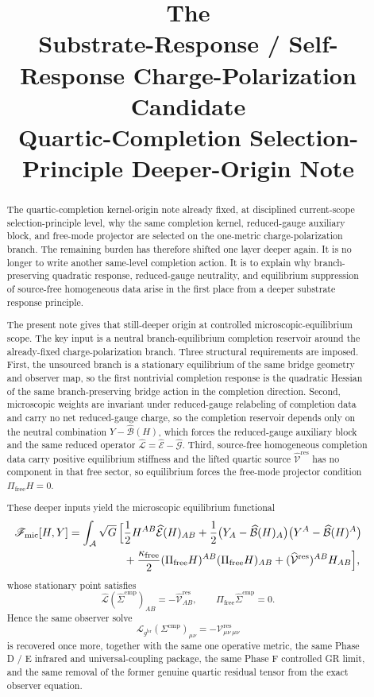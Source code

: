 \documentclass[11pt]{article}
\title{\textbf{The \TheoryName{}}\\[0.4em]
\large Substrate-Response / Self-Response Charge-Polarization Candidate\\
\large Quartic-Completion Selection-Principle Deeper-Origin Note}
\author{}
\date{}
\newcommand{\Sub}{\mathcal A}
\newcommand{\ObserverMetric}{g^{\mathrm{br}}}
\newcommand{\CompShift}{\Sigma^{\mathrm{cmp}}}
\newcommand{\CompLift}{\widehat\Sigma^{\mathrm{cmp}}}
\newcommand{\ResidualCore}{\mathcal V_{\mu\nu}^{\mathrm{res}}}
\newcommand{\ResidualLift}{\widehat{\mathcal V}^{\mathrm{res}}}
\newcommand{\SubEinLin}{\widehat{\mathcal E}}
\newcommand{\SubGaugeVec}{\widehat{\mathcal B}}
\newcommand{\SubGaugeBook}{\widehat{\mathcal G}}
\newcommand{\SubReducedEin}{\widehat{\mathcal L}}
\newcommand{\FreeProj}{\Pi_{\mathrm{free}}}
\newcommand{\GaugeAux}{Y}
\newcommand{\ReducedEin}{\mathcal L_{\ObserverMetric}}
\newcommand{\MicFunctional}{\mathscr F_{\mathrm{mic}}}
\newcommand{\FreeStiff}{\kappa_{\mathrm{free}}}
\begin{document}
\maketitle

\begin{abstract}
The quartic-completion kernel-origin note already fixed, at disciplined current-scope selection-principle level, why the same completion kernel, reduced-gauge auxiliary block, and free-mode projector are selected on the one-metric charge-polarization branch. The remaining burden has therefore shifted one layer deeper again. It is no longer to write another same-level completion action. It is to explain why branch-preserving quadratic response, reduced-gauge neutrality, and equilibrium suppression of source-free homogeneous data arise in the first place from a deeper substrate response principle.

The present note gives that still-deeper origin at controlled microscopic-equilibrium scope. The key input is a neutral branch-equilibrium completion reservoir around the already-fixed charge-polarization branch. Three structural requirements are imposed. First, the unsourced branch is a stationary equilibrium of the same bridge geometry and observer map, so the first nontrivial completion response is the quadratic Hessian of the same branch-preserving bridge action in the completion direction. Second, microscopic weights are invariant under reduced-gauge relabeling of completion data and carry no net reduced-gauge charge, so the completion reservoir depends only on the neutral combination \(\GaugeAux-\SubGaugeVec(H)\), which forces the reduced-gauge auxiliary block and the same reduced operator \(\SubReducedEin=\SubEinLin-\SubGaugeBook\). Third, source-free homogeneous completion data carry positive equilibrium stiffness and the lifted quartic source \(\ResidualLift\) has no component in that free sector, so equilibrium forces the free-mode projector condition \(\FreeProj H=0\).

These deeper inputs yield the microscopic equilibrium functional
\[
\begin{aligned}
\MicFunctional[H,\GaugeAux]
=
\int_{\Sub}\sqrt{G}\,
\Bigl[
&\frac12 H^{AB}\SubEinLin(H)_{AB}
+\frac12\bigl(\GaugeAux_A-\SubGaugeVec(H)_A\bigr)
\bigl(\GaugeAux^A-\SubGaugeVec(H)^A\bigr)
\\
&+\frac{\FreeStiff}{2}(\FreeProj H)^{AB}(\FreeProj H)_{AB}
+(\ResidualLift)^{AB}H_{AB}
\Bigr],
\end{aligned}
\]
whose stationary point satisfies
\[
\SubReducedEin(\CompLift)_{AB}=-\ResidualLift_{AB},
\qquad
\FreeProj\CompLift=0.
\]
Hence the same observer solve
\[
\ReducedEin(\CompShift)_{\mu\nu}=-\ResidualCore{}_{\mu\nu}
\]
is recovered once more, together with the same one operative metric, the same Phase D / E infrared and universal-coupling package, the same Phase F controlled GR limit, and the same removal of the former genuine quartic residual tensor from the exact observer equation.


\end{abstract}
\end{document}
